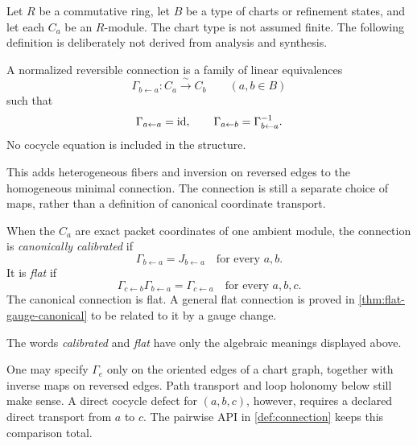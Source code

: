 Let $R$ be a commutative ring, let $B$ be a type of charts or refinement
states, and let each $C_a$ be an $R$-module.  The chart type is not assumed
finite.  The following definition is deliberately not derived from analysis
and synthesis.

\begin{definition}
\label{def:connection}
A normalized reversible connection is a family of linear equivalences
\[
\Gamma_{b\leftarrow a}:C_a\xrightarrow{\;\sim\;}C_b
\qquad(a,b\in B)
\]
such that
\[
\Gamma_{a\leftarrow a}=\mathrm{id},
\qquad
\Gamma_{a\leftarrow b}=\Gamma_{b\leftarrow a}^{-1}.
\]
No cocycle equation is included in the structure.
\end{definition}

This adds heterogeneous fibers and inversion on reversed edges to the
homogeneous minimal connection.  The connection is still a separate choice
of maps, rather than a definition of canonical coordinate transport.

\begin{definition}
\label{def:calibration-flatness}
When the $C_a$ are exact packet coordinates of one ambient module, the
connection is \emph{canonically calibrated} if
\[
\Gamma_{b\leftarrow a}=J_{b\leftarrow a}
\quad\text{for every }a,b.
\]
It is \emph{flat} if
\[
\Gamma_{c\leftarrow b}\Gamma_{b\leftarrow a}
=
\Gamma_{c\leftarrow a}
\quad\text{for every }a,b,c.
\]
The canonical connection is flat.  A general flat connection is proved in
\cref{thm:flat-gauge-canonical} to be related to it by a gauge change.
\end{definition}

The words \emph{calibrated} and \emph{flat} have only the algebraic meanings
displayed above.

\begin{remark}
One may specify $\Gamma_e$ only on the oriented edges of a chart graph,
together with inverse maps on reversed edges.  Path transport and loop
holonomy below still make sense.  A direct cocycle defect for $(a,b,c)$,
however, requires a declared direct transport from $a$ to $c$.  The pairwise
API in \cref{def:connection} keeps this comparison total.
\end{remark}

